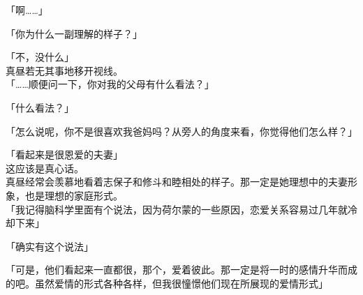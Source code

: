 「啊……」

「你为什么一副理解的样子？」

「不，没什么」\\

真昼若无其事地移开视线。\\

「……顺便问一下，你对我的父母有什么看法？」

「什么看法？」

「怎么说呢，你不是很喜欢我爸妈吗？从旁人的角度来看，你觉得他们怎么样？」

「看起来是很恩爱的夫妻」\\

这应该是真心话。\\

真昼经常会羡慕地看着志保子和修斗和睦相处的样子。那一定是她理想中的夫妻形象，也是理想的家庭形式。\\

「我记得脑科学里面有个说法，因为荷尔蒙的一些原因，恋爱关系容易过几年就冷却下来」

「确实有这个说法」

「可是，他们看起来一直都很，那个，爱着彼此。那一定是将一时的感情升华而成的吧。虽然爱情的形式各种各样，但我很憧憬他们现在所展现的爱情形式」\\

